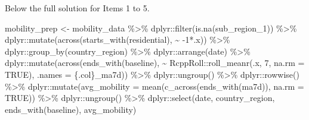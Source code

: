 \documentclass[
]{book}
\newenvironment{Shaded}{\begin{snugshade}}{\end{snugshade}}
\newcommand{\AttributeTok}[1]{\textcolor[rgb]{0.77,0.63,0.00}{#1}}
\newcommand{\ConstantTok}[1]{\textcolor[rgb]{0.00,0.00,0.00}{#1}}
\newcommand{\DecValTok}[1]{\textcolor[rgb]{0.00,0.00,0.81}{#1}}
\newcommand{\FunctionTok}[1]{\textcolor[rgb]{0.00,0.00,0.00}{#1}}
\newcommand{\NormalTok}[1]{#1}
\newcommand{\OtherTok}[1]{\textcolor[rgb]{0.56,0.35,0.01}{#1}}
\newcommand{\SpecialCharTok}[1]{\textcolor[rgb]{0.00,0.00,0.00}{#1}}
\newcommand{\StringTok}[1]{\textcolor[rgb]{0.31,0.60,0.02}{#1}}
\begin{document}
Below the full solution for Items 1 to 5.

\begin{Shaded}
\begin{Highlighting}[]
\NormalTok{mobility\_prep }\OtherTok{\textless{}{-}}\NormalTok{ mobility\_data }\SpecialCharTok{\%\textgreater{}\%} 
\NormalTok{  dplyr}\SpecialCharTok{::}\FunctionTok{filter}\NormalTok{(}\FunctionTok{is.na}\NormalTok{(sub\_region\_1)) }\SpecialCharTok{\%\textgreater{}\%}
\NormalTok{  dplyr}\SpecialCharTok{::}\FunctionTok{mutate}\NormalTok{(}\FunctionTok{across}\NormalTok{(}\FunctionTok{starts\_with}\NormalTok{(}\StringTok{\textquotesingle{}residential\textquotesingle{}}\NormalTok{), }\SpecialCharTok{\textasciitilde{}} \SpecialCharTok{{-}}\DecValTok{1}\SpecialCharTok{*}\NormalTok{.x)) }\SpecialCharTok{\%\textgreater{}\%}
\NormalTok{  dplyr}\SpecialCharTok{::}\FunctionTok{group\_by}\NormalTok{(country\_region) }\SpecialCharTok{\%\textgreater{}\%}
\NormalTok{  dplyr}\SpecialCharTok{::}\FunctionTok{arrange}\NormalTok{(date) }\SpecialCharTok{\%\textgreater{}\%} 
\NormalTok{  dplyr}\SpecialCharTok{::}\FunctionTok{mutate}\NormalTok{(}\FunctionTok{across}\NormalTok{(}\FunctionTok{ends\_with}\NormalTok{(}\StringTok{\textquotesingle{}baseline\textquotesingle{}}\NormalTok{), }\SpecialCharTok{\textasciitilde{}}\NormalTok{ RcppRoll}\SpecialCharTok{::}\FunctionTok{roll\_meanr}\NormalTok{(.x, }\DecValTok{7}\NormalTok{, }\AttributeTok{na.rm =} \ConstantTok{TRUE}\NormalTok{), }\AttributeTok{.names =} \StringTok{\textquotesingle{}\{.col\}\_ma7d\textquotesingle{}}\NormalTok{)) }\SpecialCharTok{\%\textgreater{}\%}
\NormalTok{  dplyr}\SpecialCharTok{::}\FunctionTok{ungroup}\NormalTok{() }\SpecialCharTok{\%\textgreater{}\%} 
\NormalTok{  dplyr}\SpecialCharTok{::}\FunctionTok{rowwise}\NormalTok{() }\SpecialCharTok{\%\textgreater{}\%} 
\NormalTok{  dplyr}\SpecialCharTok{::}\FunctionTok{mutate}\NormalTok{(}\AttributeTok{avg\_mobility =} \FunctionTok{mean}\NormalTok{(}\FunctionTok{c\_across}\NormalTok{(}\FunctionTok{ends\_with}\NormalTok{(}\StringTok{\textquotesingle{}ma7d\textquotesingle{}}\NormalTok{)), }\AttributeTok{na.rm =} \ConstantTok{TRUE}\NormalTok{)) }\SpecialCharTok{\%\textgreater{}\%}
\NormalTok{  dplyr}\SpecialCharTok{::}\FunctionTok{ungroup}\NormalTok{() }\SpecialCharTok{\%\textgreater{}\%} 
\NormalTok{  dplyr}\SpecialCharTok{::}\FunctionTok{select}\NormalTok{(date, country\_region, }\FunctionTok{ends\_with}\NormalTok{(}\StringTok{\textquotesingle{}baseline\textquotesingle{}}\NormalTok{), avg\_mobility) }
\end{Highlighting}
\end{Shaded}
\end{document}
